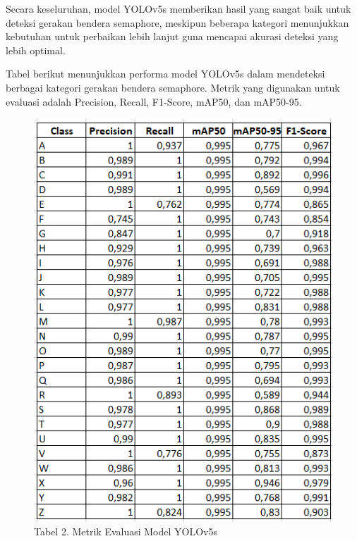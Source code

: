 \documentclass[12pt,a4paper]{article}
\begin{document}
\begin{adjustwidth}{3em}{0pt}
\begin{itemize}
Secara keseluruhan, model YOLOv5s memberikan hasil yang sangat baik untuk deteksi gerakan bendera semaphore, meskipun beberapa kategori menunjukkan kebutuhan untuk perbaikan lebih lanjut guna mencapai akurasi deteksi yang lebih optimal. 
\end{itemize}
\end{adjustwidth}

Tabel berikut menunjukkan performa model YOLOv5s dalam mendeteksi berbagai kategori gerakan bendera semaphore. Metrik yang digunakan untuk evaluasi adalah Precision, Recall, F1-Score, mAP50, dan mAP50-95.

\begin{figure}[h]
        \centering
        \includegraphics[width=0.6\linewidth]{Images/Gambar6Modelyolov8x.png}
        \caption*{Tabel 2. Metrik Evaluasi Model YOLOv5s}
        \label{fig:enter-label}
    \end{figure}
\end{document}
